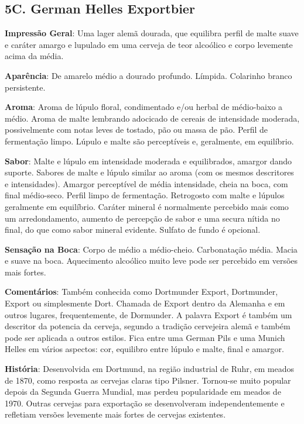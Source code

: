 \subsection*{5C. German Helles Exportbier}
\textbf{Impressão Geral}: Uma lager alemã dourada, que equilibra perfil de malte suave e caráter amargo e lupulado em uma cerveja de teor alcoólico e corpo levemente acima da média.

\textbf{Aparência}: De amarelo médio a dourado profundo. Límpida. Colarinho branco persistente.

\textbf{Aroma}: Aroma de lúpulo floral, condimentado e/ou herbal de médio-baixo a médio. Aroma de malte lembrando adocicado de cereais de intensidade moderada, possivelmente com notas leves de tostado, pão ou massa de pão. Perfil de fermentação limpo. Lúpulo e malte são perceptíveis e, geralmente, em equilíbrio.

\textbf{Sabor}: Malte e lúpulo em intensidade moderada e equilibrados, amargor dando suporte. Sabores de malte e lúpulo similar ao aroma (com os mesmos descritores e intensidades). Amargor perceptível de média intensidade, cheia na boca, com final médio-seco. Perfil limpo de fermentação. Retrogosto com malte e lúpulos geralmente em equilíbrio. Caráter mineral é normalmente percebido mais como um arredondamento, aumento de percepção de sabor e uma secura nítida no final, do que como sabor mineral evidente. Sulfato de fundo é opcional.

\textbf{Sensação na Boca}: Corpo de médio a médio-cheio. Carbonatação média. Macia e suave na boca. Aquecimento alcoólico muito leve pode ser percebido em versões mais fortes.

\textbf{Comentários}: Também conhecida como Dortmunder Export, Dortmunder, Export ou simplesmente Dort. Chamada de Export dentro da Alemanha e em outros lugares, frequentemente, de Dormunder. A palavra Export é também um descritor da potencia da cerveja, segundo a tradição cervejeira alemã e também pode ser aplicada a outros estilos. Fica entre uma German Pils e uma Munich Helles em vários aspectos: cor, equilibro entre lúpulo e malte, final e amargor.

\textbf{História}: Desenvolvida em Dortmund, na região industrial de Ruhr, em meados de 1870, como resposta as cervejas claras tipo Pilsner. Tornou-se muito popular depois da Segunda Guerra Mundial, mas perdeu popularidade em meados de 1970. Outras cervejas para exportação se desenvolveram independentemente e refletiam versões levemente mais fortes de cervejas existentes.

